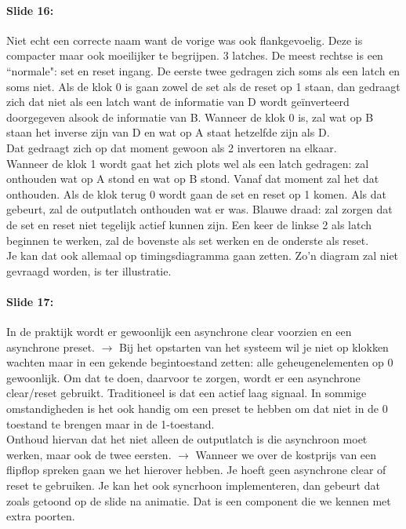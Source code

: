 \documentclass[10pt,a4paper]{book}
\begin{document}
\paragraph{Slide 16:} Niet echt een correcte naam want de vorige was ook flankgevoelig. Deze is compacter maar ook moeilijker te begrijpen. 3 latches. De meest rechtse is een ``normale": set en reset ingang. De eerste twee gedragen zich soms als een latch en soms niet. Als de klok 0 is gaan zowel de set als de reset op 1 staan, dan gedraagt zich dat niet als een latch want de informatie van D wordt ge\"inverteerd doorgegeven alsook de informatie van B. Wanneer de klok 0 is, zal wat op B staan het inverse zijn van D en wat op A staat hetzelfde zijn als D.\\
Dat gedraagt zich op dat moment gewoon als 2 invertoren na elkaar.\\
Wanneer de klok 1 wordt gaat het zich plots wel als een latch gedragen: zal onthouden wat op A stond en wat op B stond. Vanaf dat moment zal het dat onthouden. Als de klok terug 0 wordt gaan de set en reset op 1 komen. Als dat gebeurt, zal de outputlatch onthouden wat er was. Blauwe draad: zal zorgen dat de set en reset niet tegelijk actief kunnen zijn. Een keer de linkse 2 als latch beginnen te werken, zal de bovenste als set werken en de onderste als reset.\\
Je kan dat ook allemaal op timingsdiagramma gaan zetten. Zo'n diagram zal niet gevraagd worden, is ter illustratie.

\paragraph{Slide 17:} In de praktijk wordt er gewoonlijk een asynchrone clear voorzien en een asynchrone preset. $\rightarrow$ Bij het opstarten van het systeem wil je niet op klokken wachten maar in een gekende begintoestand zetten: alle geheugenelementen op 0 gewoonlijk. Om dat te doen, daarvoor te zorgen, wordt er een asynchrone clear/reset gebruikt. Traditioneel is dat een actief laag signaal. In sommige omstandigheden is het ook handig om een preset te hebben om dat niet in de 0 toestand te brengen maar in de 1-toestand.\\
Onthoud hiervan dat het niet alleen de outputlatch is die asynchroon moet werken, maar ook de twee eersten. $\rightarrow$ Wanneer we over de kostprijs van een flipflop spreken gaan we het hierover hebben.
Je hoeft geen asynchrone clear of reset te gebruiken. Je kan het ook syncrhoon implementeren, dan gebeurt dat zoals getoond op de slide na animatie. Dat is een component die we kennen met extra poorten.
\end{document}
